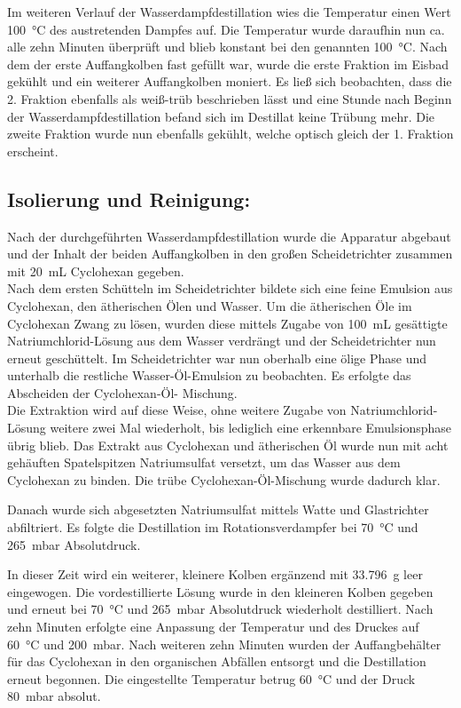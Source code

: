 Im weiteren Verlauf der Wasserdampfdestillation wies die Temperatur einen Wert \SI{100}{\celsius} des austretenden Dampfes auf.
Die Temperatur wurde daraufhin nun ca. alle zehn Minuten überprüft und blieb konstant bei den genannten  \SI{100}{\celsius}.
Nach dem der erste Auffangkolben fast gefüllt war, wurde die erste Fraktion im Eisbad gekühlt und ein weiterer Auffangkolben moniert.
Es ließ sich beobachten, dass die 2. Fraktion ebenfalls als weiß-trüb beschrieben lässt und eine Stunde nach Beginn der Wasserdampfdestillation befand sich im Destillat keine Trübung mehr. Die zweite Fraktion wurde nun ebenfalls gekühlt, welche optisch gleich der 1. Fraktion erscheint.

\subsection*{Isolierung und Reinigung:}
Nach der durchgeführten Wasserdampfdestillation wurde die Apparatur abgebaut und der Inhalt der beiden Auffangkolben in den großen Scheidetrichter zusammen mit \SI{20}{\milli \liter} Cyclohexan gegeben.\\
Nach dem ersten Schütteln im Scheidetrichter bildete sich eine feine Emulsion aus Cyclohexan, den ätherischen Ölen und Wasser.
Um die ätherischen Öle im Cyclohexan Zwang zu lösen, wurden diese mittels Zugabe von \SI{100}{\milli \liter} gesättigte Natriumchlorid-Lösung aus dem Wasser verdrängt und der Scheidetrichter nun erneut geschüttelt.
Im Scheidetrichter war nun oberhalb eine ölige Phase und unterhalb die restliche Wasser-Öl-Emulsion zu beobachten. Es erfolgte das Abscheiden der Cyclohexan-Öl- Mischung.\\

Die Extraktion wird auf diese Weise, ohne weitere Zugabe von Natriumchlorid-Lösung weitere zwei Mal wiederholt, bis lediglich eine erkennbare Emulsionsphase übrig blieb.
Das Extrakt aus Cyclohexan und ätherischen Öl wurde nun mit acht gehäuften Spatelspitzen Natriumsulfat versetzt, um das Wasser aus dem Cyclohexan zu binden. Die trübe Cyclohexan-Öl-Mischung wurde dadurch klar. 

\newpage

Danach wurde sich abgesetzten Natriumsulfat mittels Watte und Glastrichter abfiltriert. Es folgte die Destillation im Rotationsverdampfer bei \SI{70}{\celsius} und \SI{265}{\milli \bar} Absolutdruck.

In dieser Zeit wird ein weiterer, kleinere Kolben ergänzend mit \SI{33,796}{\gram} leer eingewogen.
Die vordestillierte Lösung wurde in den kleineren Kolben gegeben und erneut bei \SI{70}{\celsius} und \SI{265}{\milli \bar} Absolutdruck wiederholt destilliert.
Nach zehn Minuten erfolgte eine Anpassung der Temperatur und  des Druckes auf \SI{60}{\celsius} und \SI{200}{\milli \bar}.
Nach weiteren zehn Minuten wurden der Auffangbehälter für das Cyclohexan in den organischen Abfällen entsorgt und die Destillation erneut begonnen. Die eingestellte Temperatur betrug \SI{60}{\celsius} und der Druck \SI{80}{\milli \bar} absolut.\\

